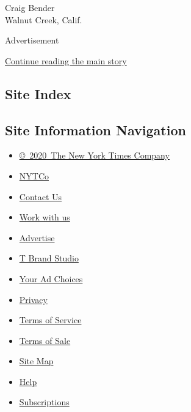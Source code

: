 Craig Bender\\
Walnut Creek, Calif.

Advertisement

\protect\hyperlink{after-bottom}{Continue reading the main story}

\hypertarget{site-index}{%
\subsection{Site Index}\label{site-index}}

\hypertarget{site-information-navigation}{%
\subsection{Site Information
Navigation}\label{site-information-navigation}}

\begin{itemize}
\tightlist
\item
  \href{https://help.nytimes.com/hc/en-us/articles/115014792127-Copyright-notice}{©~2020~The
  New York Times Company}
\end{itemize}

\begin{itemize}
\tightlist
\item
  \href{https://www.nytco.com/}{NYTCo}
\item
  \href{https://help.nytimes.com/hc/en-us/articles/115015385887-Contact-Us}{Contact
  Us}
\item
  \href{https://www.nytco.com/careers/}{Work with us}
\item
  \href{https://nytmediakit.com/}{Advertise}
\item
  \href{http://www.tbrandstudio.com/}{T Brand Studio}
\item
  \href{https://www.nytimes.com/privacy/cookie-policy\#how-do-i-manage-trackers}{Your
  Ad Choices}
\item
  \href{https://www.nytimes.com/privacy}{Privacy}
\item
  \href{https://help.nytimes.com/hc/en-us/articles/115014893428-Terms-of-service}{Terms
  of Service}
\item
  \href{https://help.nytimes.com/hc/en-us/articles/115014893968-Terms-of-sale}{Terms
  of Sale}
\item
  \href{https://spiderbites.nytimes.com}{Site Map}
\item
  \href{https://help.nytimes.com/hc/en-us}{Help}
\item
  \href{https://www.nytimes.com/subscription?campaignId=37WXW}{Subscriptions}
\end{itemize}
